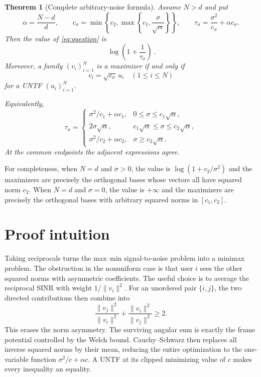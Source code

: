 \documentclass[11pt]{article}
\newtheorem{theorem}{Theorem}
\begin{document}
\begin{theorem}[Complete arbitrary-noise formula]\label{thm:main}
Assume $N>d$ and put
\[
 \alpha=\frac{N-d}{d},\qquad
 c_\sigma=\min\!\left\{c_2,
              \max\!\left\{c_1,\frac{\sigma}{\sqrt\alpha}\right\}\right\},
 \qquad
 \tau_\sigma=\frac{\sigma^2}{c_\sigma}+\alpha c_\sigma.
\]
Then the value of \eqref{eq:question} is
\begin{equation}\label{eq:value}
 \boxed{\ \log\!\left(1+\frac1{\tau_\sigma}\right)\ }.
\end{equation}
Moreover, a family $(v_i)_{i=1}^N$ is a maximizer if and only if
\begin{equation}\label{eq:maximizers}
 v_i=\sqrt{c_\sigma}\,u_i\quad(1\le i\le N)
\end{equation}
for a UNTF $(u_i)_{i=1}^N$.

Equivalently,
\[
 \tau_\sigma=
 \begin{cases}
 \sigma^2/c_1+\alpha c_1,
   &0\le\sigma\le c_1\sqrt\alpha,\\[2mm]
 2\sigma\sqrt\alpha,
   &c_1\sqrt\alpha\le\sigma\le c_2\sqrt\alpha,\\[2mm]
 \sigma^2/c_2+\alpha c_2,
   &\sigma\ge c_2\sqrt\alpha.
 \end{cases}
\]
At the common endpoints the adjacent expressions agree.
\end{theorem}

For completeness, when $N=d$ and $\sigma>0$, the value is
$\log(1+c_2/\sigma^2)$ and the maximizers are precisely the orthogonal bases
whose vectors all have squared norm $c_2$.  When $N=d$ and $\sigma=0$, the
value is $+\infty$ and the maximizers are precisely the orthogonal bases with
arbitrary squared norms in $[c_1,c_2]$.

\section{Proof intuition}

Taking reciprocals turns the max--min signal-to-noise problem into a minimax
problem.  The obstruction in the nonuniform case is that user $i$ sees the
other squared norms with asymmetric coefficients.  The useful choice is to
average the reciprocal SINR with weight $1/\lVert v_i\rVert^2$.  For an
unordered pair $\{i,j\}$, the two directed contributions then combine into
\[
 \frac{\lVert v_j\rVert^2}{\lVert v_i\rVert^2}
 +\frac{\lVert v_i\rVert^2}{\lVert v_j\rVert^2}\ge2.
\]
This erases the norm asymmetry.  The surviving angular sum is exactly the
frame potential controlled by the Welch bound.  Cauchy--Schwarz then replaces
all inverse squared norms by their mean, reducing the entire optimization to
the one-variable function $\sigma^2/c+\alpha c$.  A UNTF at its clipped
minimizing value of $c$ makes every inequality an equality.
\end{document}
